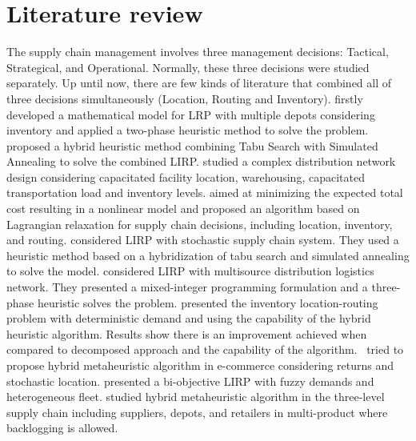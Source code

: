 \documentclass[12pt, a4paper]{article}
\begin{document}
\section{Literature review}
The supply chain management involves three management decisions: Tactical, Strategical, and Operational. Normally, these three decisions were studied separately. Up until now, there are few kinds of literature that combined all of three decisions simultaneously (Location, Routing and Inventory). \autocite{liu_two-phase_2003} firstly developed a mathematical model for LRP with multiple depots considering inventory and applied a two-phase heuristic method to solve the problem. \autocite{liu_heuristic_2005} proposed a hybrid heuristic method combining Tabu Search with Simulated Annealing to solve the combined LIRP. \autocite{ambrosino_distribution_2005} studied a complex distribution network design considering capacitated facility location, warehousing, capacitated transportation load and inventory levels. \autocite{shen_incorporating_2007} aimed at minimizing the expected total cost resulting in a nonlinear model and proposed an algorithm based on Lagrangian relaxation for supply chain decisions, including location, inventory, and routing. \autocite{javid_incorporating_2010} considered LIRP with stochastic supply chain system. They used a heuristic method based on a hybridization of tabu search and simulated annealing to solve the model. \autocite{ahmadi-javid_location-routing-inventory_2012} considered LIRP with multisource distribution logistics network. They presented a mixed-integer programming formulation and a three-phase heuristic solves the problem. \autocite{guerrero_hybrid_2013} presented the inventory location-routing problem with deterministic demand and using the capability of the hybrid heuristic algorithm. Results show there is an improvement achieved when compared to decomposed approach and the capability of the algorithm.~\autocite{liu_pseudo-parallel_2015} tried to propose hybrid metaheuristic algorithm in e-commerce considering returns and stochastic location. \autocite{tavakkoli-moghaddam_new_2016} presented a bi-objective LIRP with fuzzy demands and heterogeneous fleet. \autocite{ghorbani_hybrid_2016} studied hybrid metaheuristic algorithm in the three-level supply chain including suppliers, depots, and retailers in multi-product where backlogging is allowed.
\end{document}
